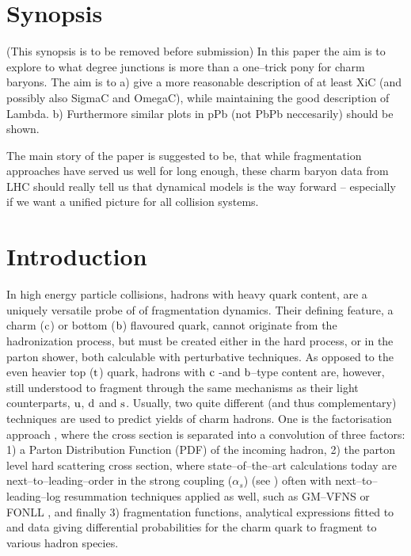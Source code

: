 \documentclass[main.tex]{subfiles}
\begin{document}
\section{Synopsis}
(This synopsis is to be removed before submission)
In this paper the aim is to explore to what degree junctions is more than a one--trick pony
for charm baryons. The aim is to a) give a more reasonable description of at least XiC (and possibly also SigmaC and OmegaC), while maintaining 
the good description of Lambda. b) Furthermore similar plots in pPb (not PbPb neccesarily) should be shown. 

The main story of the paper is suggested to be, that while fragmentation approaches have served us well for long enough, these charm baryon 
data from LHC should really tell us that dynamical models is the way forward -- especially if we want a unified picture for all collision systems.

\section{Introduction}
\label{sec:introduction}
In high energy particle collisions, hadrons with heavy quark content, are a uniquely versatile probe of of fragmentation dynamics. Their defining feature, 
a charm ($\mathrm{c}$) or bottom ($\mathrm{b}$) 
flavoured quark, cannot originate from the hadronization process, but must be created either in the hard process, or in the parton shower, 
both calculable with perturbative techniques. 
As opposed to the even heavier top ($\mathrm{t}$) quark, hadrons with $\mathrm{c}$ -and $\mathrm{b}$--type content are, however, still understood to 
fragment through the same mechanisms as their 
light counterparts, $\mathrm{u}$, $\mathrm{d}$ and $\mathrm{s}$. Usually, two quite different (and thus complementary) 
techniques are used to predict yields of charm hadrons. One is the factorisation approach \cite{Collins:1985gm,Collins:1989gx}, 
where the cross section is separated into a convolution of three factors: 1) a Parton Distribution 
Function (PDF) of the incoming hadron, 2) the parton level hard scattering cross section, where state--of--the--art calculations today are 
next--to--leading--order in the strong coupling 
($\alpha_s$) (see \eg \cite{Nason:1987xz,Nason:1989zy,Mangano:1991jk}) often with next--to--leading--log resummation techniques applied as well,
 such as \eg GM--VFNS \cite{Helenius:2018uul} or FONLL \cite{Cacciari:1998it,Cacciari:2012ny}, and finally 3) fragmentation functions, analytical 
 expressions fitted to 
\epem and \ep data \cite{} giving differential probabilities for the charm quark to fragment to various hadron species. 
\end{document}
